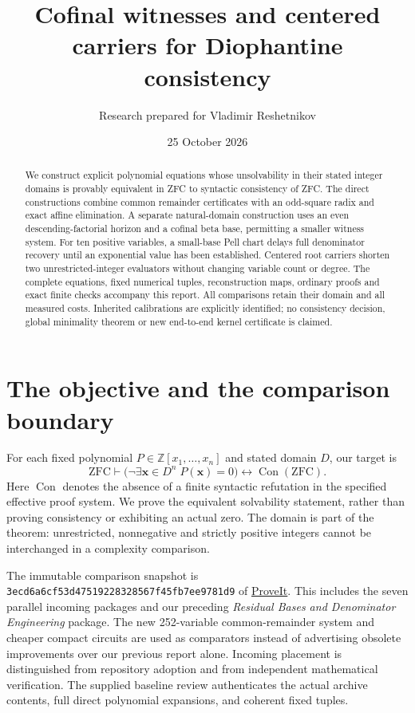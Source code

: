 \documentclass[11pt]{article}
\title{Cofinal witnesses and centered carriers for Diophantine consistency}
\author{Research prepared for Vladimir Reshetnikov}
\date{25 October 2026}
\theoremstyle{definition}\newtheorem{definition}[theorem]{Definition}
\theoremstyle{remark}\newtheorem{remark}[theorem]{Remark}
\newcommand{\Z}{\mathbb Z}\newcommand{\N}{\mathbb N}
\newcommand{\Con}{\operatorname{Con}}
\begin{document}
\maketitle
\begin{abstract}
We construct explicit polynomial equations whose unsolvability in their
stated integer domains is provably equivalent in ZFC to syntactic
consistency of ZFC. The direct constructions combine common remainder
certificates with an odd-square radix and exact affine elimination. A
separate natural-domain construction uses an even descending-factorial
horizon and a cofinal beta base, permitting a smaller witness system.
For ten positive variables, a small-base Pell chart delays full denominator
recovery until an exponential value has been established. Centered root
carriers shorten two unrestricted-integer evaluators without changing
variable count or degree.
The complete equations, fixed numerical tuples, reconstruction maps,
ordinary proofs and exact finite checks accompany this report. All
comparisons retain their domain and all measured costs. Inherited
calibrations are explicitly identified; no consistency decision, global
minimality theorem or new end-to-end kernel certificate is claimed.
\end{abstract}
\tableofcontents
\section{The objective and the comparison boundary}
For each fixed polynomial $P\in\Z[x_1,\ldots,x_n]$ and stated domain $D$,
our target is
\[
\mathrm{ZFC}\vdash
\bigl(\neg\exists\boldsymbol x\in D^n\;P(\boldsymbol x)=0\bigr)
\longleftrightarrow\Con(\mathrm{ZFC}).
\]
Here $\Con$ denotes the absence of a finite syntactic refutation in the
specified effective proof system. We prove the equivalent solvability
statement, rather than proving consistency or exhibiting an actual zero.
The domain is part of the theorem: unrestricted, nonnegative and strictly
positive integers cannot be interchanged in a complexity comparison.

The immutable comparison snapshot is
\texttt{3ecd6a6cf53d47519228328567f45fb7ee9781d9} of
\href{https://github.com/VladimirReshetnikov/ProveIt}{ProveIt}.
This includes the seven parallel incoming packages and our preceding
\emph{Residual Bases and Denominator Engineering} package. The new
252-variable common-remainder system and cheaper compact circuits are
used as comparators instead of advertising obsolete improvements over
our previous report alone. Incoming placement is distinguished from
repository adoption and from independent mathematical verification.
The supplied baseline review authenticates the actual archive contents,
full direct polynomial expansions, and coherent fixed tuples.
\end{document}

